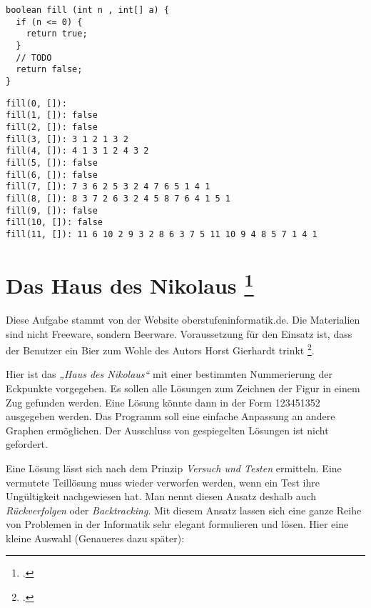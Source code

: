 \documentclass{lehramt-informatik}
\begin{document}
\begin{verbatim}
boolean fill (int n , int[] a) {
  if (n <= 0) {
    return true;
  }
  // TODO
  return false;
}
\end{verbatim}


\begin{verbatim}
fill(0, []):
fill(1, []): false
fill(2, []): false
fill(3, []): 3 1 2 1 3 2
fill(4, []): 4 1 3 1 2 4 3 2
fill(5, []): false
fill(6, []): false
fill(7, []): 7 3 6 2 5 3 2 4 7 6 5 1 4 1
fill(8, []): 8 3 7 2 6 3 2 4 5 8 7 6 4 1 5 1
fill(9, []): false
fill(10, []): false
fill(11, []): 11 6 10 2 9 3 2 8 6 3 7 5 11 10 9 4 8 5 7 1 4 1
\end{verbatim}

%

\section{Das Haus des Nikolaus
\footcite[Seite 2-3]{aud:ab:3}
}

\begin{exkurs}[Quelle]
Diese Aufgabe stammt von der Website oberstufeninformatik.de. Die
Materialien sind nicht Freeware, sondern Beerware. Voraussetzung für
den Einsatz ist, dass der Benutzer ein Bier zum Wohle des Autors Horst
Gierhardt trinkt \footcite{net:pdf:nikolaus}.
\end{exkurs}

\noindent
Hier ist das \emph{„Haus des Nikolaus“} mit einer bestimmten
Nummerierung der Eckpunkte vorgegeben. Es sollen alle Lösungen zum
Zeichnen der Figur in einem Zug gefunden werden. Eine Lösung könnte dann
in der Form 123451352 ausgegeben werden. Das Programm soll eine einfache
Anpassung an andere Graphen ermöglichen. Der Ausschluss von gespiegelten
Lösungen ist nicht gefordert.

Eine Lösung lässt sich nach dem Prinzip \emph{Versuch und Testen}
ermitteln. Eine vermutete Teillösung muss wieder verworfen werden, wenn
ein Test ihre Ungültigkeit nachgewiesen hat. Man nennt diesen Ansatz
deshalb auch \emph{Rückverfolgen} oder \emph{Backtracking}. Mit diesem
Ansatz lassen sich eine ganze Reihe von Problemen in der Informatik sehr
elegant formulieren und lösen. Hier eine kleine Auswahl (Genaueres dazu
später):
\end{document}
